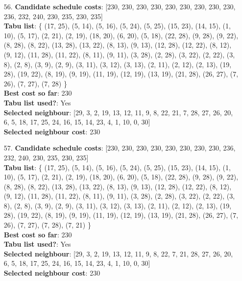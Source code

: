 \documentclass[fleqn]{article}
\begin{document}
\begin{itemize}
    \item[56.] \textbf{Candidate schedule costs}: [230, 230, 230, 230, 230, 230, 230, 230, 230, 236, 232, 240, 230, 235, 230, 235] \\
    \textbf{Tabu list}: \{ (17, 25), (5, 14), (5, 16), (5, 24), (5, 25), (15, 23), (14, 15), (1, 10), (5, 17), (2, 21), (2, 19), (18, 20), (6, 20), (5, 18), (22, 28), (9, 28), (9, 22), (8, 28), (8, 22), (13, 28), (13, 22), (8, 13), (9, 13), (12, 28), (12, 22), (8, 12), (9, 12), (11, 28), (11, 22), (8, 11), (9, 11), (3, 28), (2, 28), (3, 22), (2, 22), (3, 8), (2, 8), (3, 9), (2, 9), (3, 11), (3, 12), (3, 13), (2, 11), (2, 12), (2, 13), (19, 28), (19, 22), (8, 19), (9, 19), (11, 19), (12, 19), (13, 19), (21, 28), (26, 27), (7, 26), (7, 27), (7, 28) \} \\
    \textbf{Best cost so far}: 230 \\
    \textbf{Tabu list used?}: Yes \\
    \textbf{Selected neighbour}: [29, 3, 2, 19, 13, 12, 11, 9, 8, 22, 21, 7, 28, 27, 26, 20, 6, 5, 18, 17, 25, 24, 16, 15, 14, 23, 4, 1, 10, 0, 30] \\
    \textbf{Selected neighbour cost}: 230
      

    \item[57.] \textbf{Candidate schedule costs}: [230, 230, 230, 230, 230, 230, 230, 230, 236, 232, 240, 230, 235, 230, 235] \\
    \textbf{Tabu list}: \{ (17, 25), (5, 14), (5, 16), (5, 24), (5, 25), (15, 23), (14, 15), (1, 10), (5, 17), (2, 21), (2, 19), (18, 20), (6, 20), (5, 18), (22, 28), (9, 28), (9, 22), (8, 28), (8, 22), (13, 28), (13, 22), (8, 13), (9, 13), (12, 28), (12, 22), (8, 12), (9, 12), (11, 28), (11, 22), (8, 11), (9, 11), (3, 28), (2, 28), (3, 22), (2, 22), (3, 8), (2, 8), (3, 9), (2, 9), (3, 11), (3, 12), (3, 13), (2, 11), (2, 12), (2, 13), (19, 28), (19, 22), (8, 19), (9, 19), (11, 19), (12, 19), (13, 19), (21, 28), (26, 27), (7, 26), (7, 27), (7, 28), (7, 21) \} \\
    \textbf{Best cost so far}: 230 \\
    \textbf{Tabu list used?}: Yes \\
    \textbf{Selected neighbour}: [29, 3, 2, 19, 13, 12, 11, 9, 8, 22, 7, 21, 28, 27, 26, 20, 6, 5, 18, 17, 25, 24, 16, 15, 14, 23, 4, 1, 10, 0, 30] \\
    \textbf{Selected neighbour cost}: 230
      


\end{itemize}
\end{document}
